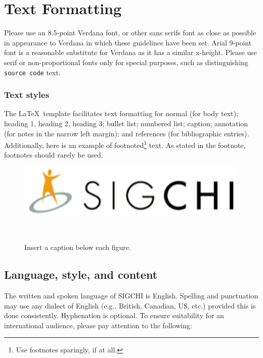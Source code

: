 \documentclass{sigchi-ext}
\begin{document}
\section{Text Formatting}
Please use an 8.5-point Verdana font, or other sans serifs font as
close as possible in appearance to Verdana in which these guidelines
have been set. Arial 9-point font is a reasonable substitute for
Verdana as it has a similar x-height. Please use serif or
non-proportional fonts only for special purposes, such as
distinguishing \texttt{source code} text.

\subsubsection{Text styles}
The \LaTeX\ template facilitates text formatting for normal (for body
text); heading 1, heading 2, heading 3; bullet list; numbered list;
caption; annotation (for notes in the narrow left margin); and
references (for bibliographic entries). Additionally, here is an
example of footnoted\footnote{Use footnotes sparingly, if at all.}
text. As stated in the footnote, footnotes should rarely be used.

\begin{figure}
  \includegraphics[width=0.9\columnwidth]{figures/sigchi-logo}
  \caption{Insert a caption below each figure.}~\label{fig:sample}
\end{figure}

\subsection{Language, style, and content}
The written and spoken language of SIGCHI is English. Spelling and
punctuation may use any dialect of English (e.g., British, Canadian,
US, etc.) provided this is done consistently. Hyphenation is
optional. To ensure suitability for an international audience, please
pay attention to the following:
\end{document}
